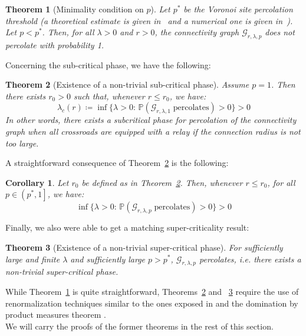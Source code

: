 \documentclass[10pt,a4paper]{amsart}
\theoremstyle{exampstyle}
\newtheorem{Theorem}{Theorem}
\newtheorem{Corollary}{Corollary}
\theoremstyle{exampnotations}
\begin{document}
\begin{Theorem}[Minimality condition on $p$]
\label{Thm.minimality}
Let $p^{*}$ be the Voronoi site percolation threshold (a theoretical estimate is given in~\cite{neher2008topological} and a numerical one is given in~\cite{becker_percolation_2009}). Let $p < p^*$. Then, for all $\lambda > 0$ and $r >0$, the connectivity graph $\mathcal{G}_{r, \lambda, p}$ does not percolate with probability 1.
\end{Theorem}

Concerning the sub-critical phase, we have the following:
\begin{Theorem}[Existence of a non-trivial sub-critical phase]
\label{Thm.subcritical}
Assume $p=1$. Then there exists $r_{0} > 0$ such that, whenever $r \leq r_0$, we have:
\begin{equation*}
    \lambda_c(r) \coloneqq \inf \lbrace \lambda > 0 : \, \mathbb{P}(\mathcal{G}_{r, \lambda, 1} \; \text{percolates}) > 0 \rbrace > 0
\end{equation*}
In other words, there exists a subcritical phase for percolation of the connectivity graph when all crossroads are equipped with a relay if the connection radius is not too large.
\end{Theorem}

A straightforward consequence of Theorem~\ref{Thm.subcritical} is the following:

\begin{Corollary}
\label{Coroll.subcritical}
Let $r_0$ be defined as in Theorem~\ref{Thm.subcritical}. Then, whenever $r \leq r_{0}$, for all $p \in \left(p^*,1\right]$, we have:
\begin{equation*}
    \inf \lbrace \lambda > 0 : \, \mathbb{P}(\mathcal{G}_{r, \lambda, p} \; \text{percolates}) > 0 \rbrace > 0
\end{equation*}
\end{Corollary}

Finally, we also were able to get a matching super-criticality result:

\begin{Theorem}[Existence of a non-trivial super-critical phase]
\label{Thm.supercritical}
For sufficiently large and finite $\lambda$ and sufficiently large $p > p^*$, $\mathcal{G}_{r,\lambda,p}$ percolates, i.e. there exists a non-trivial super-critical phase.
\end{Theorem}

While Theorem~\ref{Thm.minimality} is quite straightforward, Theorems~\ref{Thm.subcritical} and ~\ref{Thm.supercritical} require the use of renormalization techniques similar to the ones exposed in \cite{hirsch2018continuum} and the domination by product measures theorem \cite[Theorem 0.0]{liggett_domination_1997}. \\
We will carry the proofs of the former theorems in the rest of this section.
\end{document}
